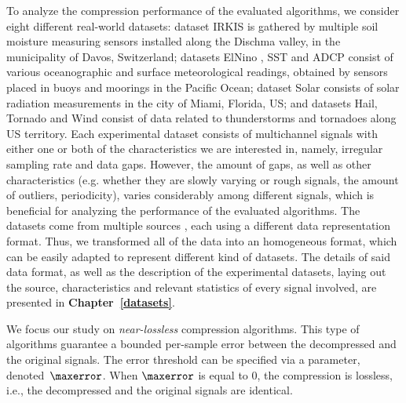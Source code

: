 To analyze the compression performance of the evaluated algorithms, we consider eight different real-world datasets: dataset IRKIS \cite{dataset:irkis} is gathered by multiple soil moisture measuring sensors installed along the Dischma valley, in the municipality of Davos, Switzerland; datasets ElNino \cite{dataset:elnino}, SST and ADCP \cite{dataset:sst1} consist of various oceanographic and surface meteorological readings, obtained by sensors placed in buoys and moorings in the Pacific Ocean; dataset Solar \cite{dataset:solar} consists of solar radiation measurements in the city of Miami, Florida, US; and datasets Hail, Tornado and Wind \cite{dataset:spc} consist of data related to thunderstorms and tornadoes along US territory. Each experimental dataset consists of multichannel signals with either one or both of the characteristics we are interested in, namely, irregular sampling rate and data gaps. However, the amount of gaps, as well as other characteristics (e.g. whether they are slowly varying or rough signals, the amount of outliers, periodicity), varies considerably among different signals, which is beneficial for analyzing the performance of the evaluated algorithms. The datasets come from multiple sources \dataCite, each using a different data representation format. Thus, we transformed all of the data into an homogeneous format, which can be easily adapted to represent different kind of datasets. The details of said data format, as well as the description of the experimental datasets, laying out the source, characteristics and relevant statistics of every signal involved, are presented in \textbf{Chapter~\ref{datasets}}.


We focus our study on \textit{near-lossless} compression algorithms. This type of algorithms guarantee a bounded per-sample error between the decompressed and the original signals. The error threshold can be specified via a parameter, denoted~$\maxerror$. When $\maxerror$ is equal to 0, the compression is lossless, i.e., the decompressed and the original signals are identical.



